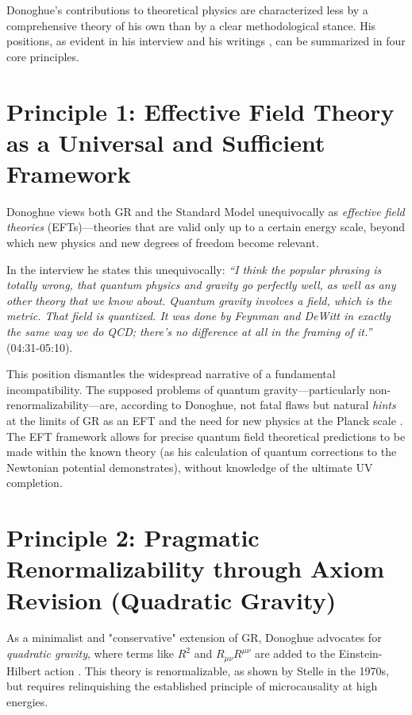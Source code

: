 	
	Donoghue's contributions to theoretical physics are characterized less by a comprehensive theory of his own than by a clear methodological stance. His positions, as evident in his interview \cite{DonoghueInterview2025} and his writings \cite{Donoghue1995, Donoghue2022}, can be summarized in four core principles.
	
	\section{Principle 1: Effective Field Theory as a Universal and Sufficient Framework}
	
	Donoghue views both GR and the Standard Model unequivocally as \emph{effective field theories} (EFTs)—theories that are valid only up to a certain energy scale, beyond which new physics and new degrees of freedom become relevant.
	
	In the interview he states this unequivocally: \emph{``I think the popular phrasing is totally wrong, that quantum physics and gravity go perfectly well, as well as any other theory that we know about. Quantum gravity involves a field, which is the metric. That field is quantized. It was done by Feynman and DeWitt in exactly the same way we do QCD; there's no difference at all in the framing of it.''} \cite{DonoghueInterview2025} (04:31-05:10).
	
	This position dismantles the widespread narrative of a fundamental incompatibility. The supposed problems of quantum gravity—particularly non-renormalizability—are, according to Donoghue, not fatal flaws but natural \emph{hints} at the limits of GR as an EFT and the need for new physics at the Planck scale \cite{Donoghue1995}. The EFT framework allows for precise quantum field theoretical predictions to be made within the known theory (as his calculation of quantum corrections to the Newtonian potential demonstrates), without knowledge of the ultimate UV completion.
	
	\section{Principle 2: Pragmatic Renormalizability through Axiom Revision (Quadratic Gravity)}
	
	As a minimalist and "conservative" extension of GR, Donoghue advocates for \emph{quadratic gravity}, where terms like $R^2$ and $R_{\mu\nu}R^{\mu\nu}$ are added to the Einstein-Hilbert action \cite{Salvio2018}. This theory is renormalizable, as shown by Stelle in the 1970s, but requires relinquishing the established principle of microcausality at high energies.
	
